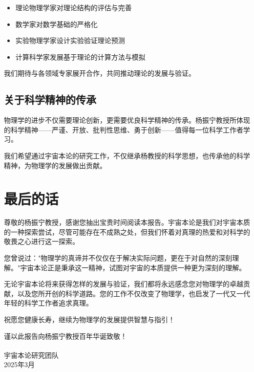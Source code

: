 \begin{itemize}
  \item 理论物理学家对理论结构的评估与完善
  \item 数学家对数学基础的严格化
  \item 实验物理学家设计实验验证理论预测
  \item 计算科学家发展基于理论的计算方法与模拟
\end{itemize}

我们期待与各领域专家展开合作，共同推动理论的发展与验证。

\subsection{关于科学精神的传承}

物理学的进步不仅需要理论创新，更需要优良科学精神的传承。杨振宁教授所体现的科学精神——严谨、开放、批判性思维、勇于创新——值得每一位科学工作者学习。

我们希望通过宇宙本论的研究工作，不仅继承杨教授的科学思想，也传承他的科学精神，为物理学的发展做出贡献。

\section{最后的话}

尊敬的杨振宁教授，感谢您抽出宝贵时间阅读本报告。宇宙本论是我们对宇宙本质的一种探索尝试，尽管可能存在不成熟之处，但我们怀着对真理的热爱和对科学的敬畏之心进行这一探索。

您曾说过："物理学的真谛并不仅仅在于解决实际问题，更在于对自然的深刻理解。"宇宙本论正是秉承这一精神，试图对宇宙的本质提供一种更为深刻的理解。

无论宇宙本论将来获得怎样的发展与验证，我们都将永远感念您对物理学的卓越贡献，以及您所开创的科学道路。您的工作不仅改变了物理学，也启发了一代又一代年轻的科学工作者追求真理。

祝愿您健康长寿，继续为物理学的发展提供智慧与指引！

\begin{flushright}
谨以此报告向杨振宁教授百年华诞致敬！\\
~\\
宇宙本论研究团队\\
2025年3月
\end{flushright} 